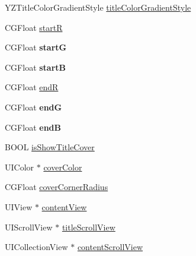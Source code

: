\begin{DoxyCompactItemize}
\item 
Y\+Z\+Title\+Color\+Gradient\+Style \mbox{\hyperlink{interface_y_z_display_view_controller_a926fe9e25e22d244ee96a0aa49ee6108}{title\+Color\+Gradient\+Style}}
\item 
C\+G\+Float \mbox{\hyperlink{interface_y_z_display_view_controller_ace1f37ef1b32be5c5b102fde972552d5}{startR}}
\item 
\mbox{\label{interface_y_z_display_view_controller_adcdaeafb38b475c776a00e07225be065}} 
C\+G\+Float {\bfseries startG}
\item 
\mbox{\label{interface_y_z_display_view_controller_a99956b79459b69f8091596d210737c50}} 
C\+G\+Float {\bfseries startB}
\item 
C\+G\+Float \mbox{\hyperlink{interface_y_z_display_view_controller_a9d24513c92869040964675983977c928}{endR}}
\item 
\mbox{\label{interface_y_z_display_view_controller_aa0b57bc65e1e59e1fd9424c00a2867eb}} 
C\+G\+Float {\bfseries endG}
\item 
\mbox{\label{interface_y_z_display_view_controller_a288672d2566486bca43df0f175ef2d85}} 
C\+G\+Float {\bfseries endB}
\item 
B\+O\+OL \mbox{\hyperlink{interface_y_z_display_view_controller_a2acedd39ff6937ae9fefb57d67213861}{is\+Show\+Title\+Cover}}
\item 
U\+I\+Color $\ast$ \mbox{\hyperlink{interface_y_z_display_view_controller_a49eb8ff313e5acb90cf4c6a50dc09885}{cover\+Color}}
\item 
C\+G\+Float \mbox{\hyperlink{interface_y_z_display_view_controller_ad99e325f68985707497a7f308b2db647}{cover\+Corner\+Radius}}
\item 
U\+I\+View $\ast$ \mbox{\hyperlink{interface_y_z_display_view_controller_ae27cda072dcf3432813991244dd76de3}{content\+View}}
\item 
U\+I\+Scroll\+View $\ast$ \mbox{\hyperlink{interface_y_z_display_view_controller_a5e97cfe36d67a38f451e1e2ebe8b3c07}{title\+Scroll\+View}}
\item 
U\+I\+Collection\+View $\ast$ \mbox{\hyperlink{interface_y_z_display_view_controller_a3ebc29b6d5f1cf022dc3de8b567049b5}{content\+Scroll\+View}}
\end{DoxyCompactItemize}


